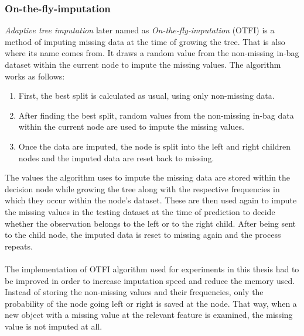 \documentclass[11pt]{article}
\begin{document}
      \subsubsection{On-the-fly-imputation}
        \label{sec:otfi}
        {\it Adaptive tree imputation} \cite{rsf} later named as {\it On-the-fly-imputation} \cite{otfi} (OTFI) is a method of imputing missing data at the time of growing the tree. That is also where its name comes from. It draws a random value from the non-missing in-bag dataset within the current node to impute the missing values. The algorithm works as follows: 
        \begin{enumerate}
        \item First, the best split is calculated as usual, using only non-missing data.
        \item After finding the best split, random values from the non-missing in-bag data within the current node are used to impute the missing values.
        \item Once the data are imputed, the node is split into the left and right children nodes and the imputed data are reset back to missing.
        \end{enumerate}
        The values the algorithm uses to impute the missing data are stored within the decision node while growing the tree along with the respective frequencies in which they occur within the node's dataset. These are then used again to impute the missing values in the testing dataset at the time of prediction to decide whether the observation belongs to the left or to the right child. After being sent to the child node, the imputed data is reset to missing again and the process repeats.
        \\~\\
        The implementation of OTFI algorithm used for experiments in this thesis had to be improved in order to increase imputation speed and reduce the memory used. Instead of storing the non-missing values and their frequencies, only the probability of the node going left or right is saved at the node. That way, when a new object with a missing value at the relevant feature is examined, the missing value is not imputed at all.
\end{document}
